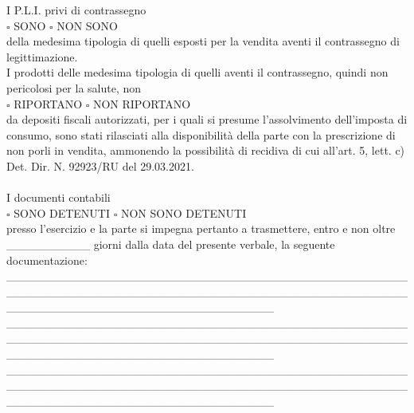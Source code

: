 \documentclass[12pt]{article}
\begin{document}
I P.L.I. privi di contrassegno\\
\begin{math}\square\end{math} SONO \begin{math}\square\end{math} NON SONO\\
della medesima tipologia di quelli esposti per la vendita aventi il contrassegno di legittimazione.\\
I prodotti delle medesima tipologia di quelli aventi il contrassegno, quindi non pericolosi per la salute, non \\
\begin{math}\square\end{math} RIPORTANO \begin{math}\square\end{math} NON RIPORTANO\\
da depositi fiscali autorizzati, per i quali si presume l’assolvimento dell’imposta di consumo, sono stati rilasciati alla disponibilità della parte con la prescrizione di non porli in vendita, ammonendo la possibilità di recidiva di cui all’art. 5, lett. c) Det. Dir. N. 92923/RU del 29.03.2021.
\\\\
I documenti contabili \\
\begin{math}\square\end{math} SONO DETENUTI \begin{math}\square\end{math} NON SONO DETENUTI\\
presso l’esercizio e la parte si impegna pertanto a trasmettere, entro e non oltre \_\_\_\_\_\_\_\_\_\_  giorni dalla data del presente verbale, la seguente documentazione: \\
\_\_\_\_\_\_\_\_\_\_\_\_\_\_\_\_\_\_\_\_\_\_\_\_\_\_\_\_\_\_\_\_\_\_\_\_\_\_\_\_\_\_\_\_\_\_\_\_\_\_\_\_\_\_\_\_\_\_\_\_\_\_\_\_\_\_\_\_\_\_\_\_\_\_\_\_\_\_\_\_\_\_\_\_\_\_\_\_\_\_\_\_\_\_\_\_\_\_\_\_\_\_\_\_\_\_\_\_\_\_\_\_\_\_\_\_\_\_\_\_\_\_\_\_\_\_\_\_ \\
\_\_\_\_\_\_\_\_\_\_\_\_\_\_\_\_\_\_\_\_\_\_\_\_\_\_\_\_\_\_\_\_\_\_\_\_\_\_\_\_\_\_\_\_\_\_\_\_\_\_\_\_\_\_\_\_\_\_\_\_\_\_\_\_\_\_\_\_\_\_\_\_\_\_\_\_\_\_\_\_\_\_\_\_\_\_\_\_\_\_\_\_\_\_\_\_\_\_\_\_\_\_\_\_\_\_\_\_\_\_\_\_\_\_\_\_\_\_\_\_\_\_\_\_\_\_\_\_ \\
\_\_\_\_\_\_\_\_\_\_\_\_\_\_\_\_\_\_\_\_\_\_\_\_\_\_\_\_\_\_\_\_\_\_\_\_\_\_\_\_\_\_\_\_\_\_\_\_\_\_\_\_\_\_\_\_\_\_\_\_\_\_\_\_\_\_\_\_\_\_\_\_\_\_\_\_\_\_\_\_\_\_\_\_\_\_\_\_\_\_\_\_\_\_\_\_\_\_\_\_\_\_\_\_\_\_\_\_\_\_\_\_\_\_\_\_\_\_\_\_\_\_\_\_\_\_\_\_ \\
\end{document}
